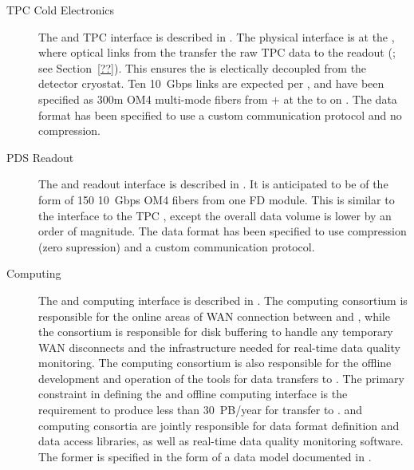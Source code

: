 \begin{description}
\item[TPC Cold Electronics] The  and TPC  interface is described in
. The physical interface is at the , where optical links from the  transfer
the raw TPC data to the   readout (; see
Section~\ref{??}). This ensures the  is electically decoupled from the detector
cryostat. Ten \SI{10}{Gbps} links are expected per , and have
been specified as 300m OM4 multi-mode fibers from + at the  to
 on . The data format has been specified
to use a custom communication protocol and no
compression.

\item[PDS Readout] The  and  readout interface is described in
. It is anticipated to
be of the form of 150  \SI{10}{Gbps} OM4 fibers from one FD module. 
This
is similar to the interface to the TPC , except the overall
data volume is lower by an order of magnitude. The data format has been specified to use
compression (zero supression) and a custom communication protocol.

\item[Computing] The  and computing interface is described in .
 The computing consortium %
 is responsible for the online areas of WAN connection between \surf and
\fnal, while the  consortium is responsible for disk buffering
to handle any temporary WAN disconnects and the infrastructure needed
for real-time data quality monitoring.  The computing consortium 
is also
responsible for the offline development and operation of the tools for data
transfers to \fnal. The primary
constraint in defining the  and offline computing interface is the
requirement to produce less than \SI{30}{PB/year} %
for transfer to
\fnal.  and %
computing consortia are jointly responsible for data
format definition and data access libraries, as well as real-time data
quality monitoring software. The former is specified in the form of a 
data model documented in .


\end{description}
